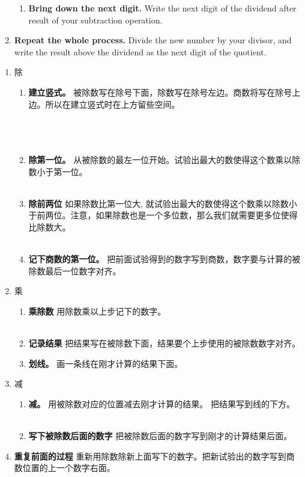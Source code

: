 \begin{paracol}{2}
\begin{enumerate}
\begin{enumerate}
\item {\bf Bring down the next digit.} Write the next digit of the dividend after result of your subtraction operation.
\end{enumerate}
\item {\bf Repeat the whole process.} Divide the new number by your divisor, and write the result above the dividend as the next digit of the quotient.
\end{enumerate}
\switchcolumn[1]
\begin{enumerate}
\item 除
\begin{enumerate}
\item {\bf 建立竖式。} 被除数写在除号下面，除数写在除号左边。商数将写在除号上边。所以在建立竖式时在上方留些空间。\\ \\ \\ \\ 
\item {\bf 除第一位。} 从被除数的最左一位开始。试验出最大的数使得这个数乘以除数小于第一位。\\ \\ 
\item {\bf 除前两位} 如果除数比第一位大, 就试验出最大的数使得这个数乘以除数小于前两位。注意，如果除数也是一个多位数，那么我们就需要更多位使得比除数大。\\ \\ 
\item {\bf 记下商数的第一位。} 把前面试验得到的数字写到商数，数字要与计算的被除数最后一位数字对齐。\\ 
\end{enumerate}
\item 乘
\begin{enumerate}
\item {\bf 乘除数} 用除数乘以上步记下的数字。\\ \\ 
\item {\bf 记录结果} 把结果写在被除数下面，结果要个上步使用的被除数数字对齐。
\item {\bf 划线。} 画一条线在刚才计算的结果下面。\\ 
\end{enumerate}
\item 减
\begin{enumerate}
\item {\bf 减。} 用被除数对应的位置减去刚才计算的结果。 把结果写到线的下方。\\ \\ 
\item {\bf 写下被除数后面的数字} 把被除数后面的数字写到刚才的计算结果后面。\\ 
\end{enumerate}
\item {\bf 重复前面的过程} 重新用除数除新上面写下的数字。把新试验出的数字写到商数位置的上一个数字右面。
\end{enumerate}
\end{paracol}

